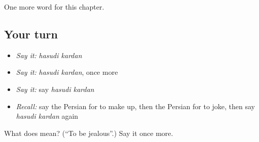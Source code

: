 \begin{grammarlens}[title={What you've built}]
One more word for this chapter.
\end{grammarlens}

\subsection*{Your turn}
\begin{itemize}
\raggedright
  \item \emph{Say it:} \emph{hasudi kardan}
  \item \emph{Say it:} \emph{hasudi kardan}, once more
  \item \emph{Say it:} say \emph{hasudi kardan}
  \item \emph{Recall:} say the Persian for to make up, then the Persian for to joke, then say \emph{hasudi kardan} again
\end{itemize}

\begin{tcolorbox}[breakable,colback=teal!4,colframe=teal!35!black,title={Before you move on}]
What does   mean? (\textquotedblleft{}To be jealous\textquotedblright{}.) Say it once more.
\end{tcolorbox}
